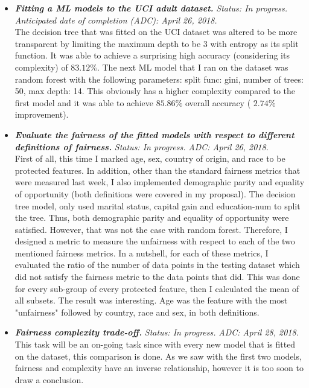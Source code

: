 \documentclass[11pt]{article}
\begin{document}
\begin{itemize}

\item \textbf{\textit{Fitting a ML models to the UCI adult dataset.}} \textit{Status: In progress.} \textit{Anticipated date of completion (ADC): April 26, 2018.} \\
The decision tree that was fitted on the UCI dataset was altered to be more transparent by limiting the maximum depth to be 3 with entropy as its split function. It was able to achieve a surprising high accuracy (considering its complexity) of $83.12\%$. The next ML model that I ran on the dataset was random forest with the following parameters: split func: gini, number of trees: 50, max depth: 14. This obviously has a higher complexity compared to the first model and it was able to achieve $85.86\%$ overall accuracy ( $2.74\%$ improvement).


\item \textbf{\textit{Evaluate the fairness of the fitted models with respect to different definitions of fairness.}} \textit{Status: In progress.} \textit{ADC: April 26, 2018.} \\
First of all, this time I marked age, sex, country of origin, and race to be protected features. In addition, other than the standard fairness metrics that were measured last week, I also implemented demographic parity and equality of opportunity (both definitions were covered in my proposal). The decision tree model, only used marital status, capital gain and education-num to split the tree. Thus, both demographic parity and equality of opportunity were satisfied. However, that was not the case with random forest. Therefore, I designed a metric to measure the unfairness with respect to each of the two mentioned fairness metrics. In a nutshell, for each of these metrics, I evaluated the ratio of the number of data points in the testing dataset which did not satisfy the fairness metric to the data points that did. This was done for every sub-group of every protected feature, then I calculated the mean of all subsets. The result was interesting. Age was the feature with the most "unfairness" followed by country, race and sex, in both definitions.

\item \textbf{\textit{Fairness complexity trade-off.}} \textit{Status: In progress.} \textit{ADC: April 28, 2018.} \\
This task will be an on-going task since with every new model that is fitted on the dataset, this comparison is done. As we saw with the first two models, fairness and complexity have an inverse relationship, however it is too soon to draw a conclusion.

\end{itemize} 
\end{document}
